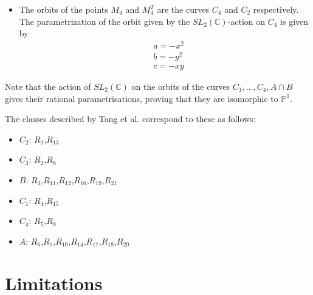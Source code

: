 \documentclass{amsart}
\begin{document}
\begin{itemize}
  \item  The orbits of the points $M_4$ and $M_4^T$ are the curves $C_4$ and $C_2$ respectively. 
  The parametrization of the orbit given by the $SL_2(\mathbb{C})$-action on $C_4$ is given by
  \begin{align*}
  &a = -x^2\\
  &b = -y^2\\
  &c = -xy
  \end{align*}
\end{itemize}

Note that the action of $SL_2(\mathbb{C})$ on the orbits of the curves $C_1, \ldots, C_4, A\cap B$ gives their rational parametrisations, proving that they are isomorphic to $\mathbb{P}^1$.

The classes described by Tang et al. \cite{TANG2014} correspond to these as follows:
\begin{itemize}
    \item $C_2$: $R_1$,$R_{13}$
    \item $C_3$: $R_2$,$R_8$
    \item $B$: $R_3$,$R_{11}$,$R_{12}$,$R_{16}$,$R_{19}$,$R_{21}$
    \item $C_1$: $R_4$,$R_{15}$
    \item $C_4$: $R_5$,$R_9$
    \item $A$: $R_6$,$R_7$,$R_{10}$,$R_{14}$,$R_{17}$,$R_{18}$,$R_{20}$
\end{itemize}




\section{Limitations}




\end{document}
